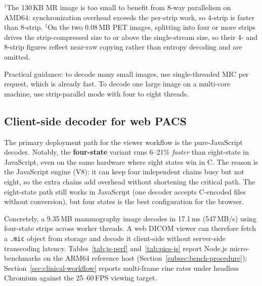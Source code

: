 \documentclass[journal]{IEEEtran}
\begin{document}
\begin{table}[htbp]
\vspace{2pt}
{\scriptsize $^\dagger$The 130\,KB MR image is too small to benefit from 8-way
parallelism on AMD64: synchronization overhead exceeds the per-strip work, so
4-strip is faster than 8-strip. $^\ddagger$On the two 0.08\,MB PET images,
splitting into four or more strips drives the strip-compressed size to or above
the single-stream size, so their 4- and 8-strip figures reflect near-raw
copying rather than entropy decoding and are omitted.}
\end{table}

Practical guidance: to decode many small images, use single-threaded MIC
per request, which is already fast. To decode one large image on a multi-core
machine, use strip-parallel mode with four to eight threads.

\subsection{Client-side decoder for web PACS}
\label{sec:browser-results}

The primary deployment path for the viewer workflow is the pure-JavaScript
decoder. Notably, the \textbf{four-state} variant runs 6--21\% \emph{faster}
than eight-state in JavaScript, even on the same hardware where eight states win
in C. The reason is the JavaScript engine (V8): it can keep four independent
chains busy but not eight, so the extra chains add overhead without shortening
the critical path. The eight-state path still works in JavaScript (one decoder
accepts C-encoded files without conversion), but four states is the best
configuration for the browser.

Concretely, a 9.35\,MB mammography image decodes in 17.1\,ms (547\,MB/s) using
four-state strips across worker threads. A web DICOM viewer can therefore fetch
a \texttt{.mic} object from storage and decode it client-side without
server-side transcoding latency. Tables~\ref{tab:js-perf}
and~\ref{tab:pics-js} report Node.js micro-benchmarks on the ARM64 reference
host (Section~\ref{subsec:bench-procedure}); Section~\ref{sec:clinical-workflow}
reports multi-frame cine rates under headless Chromium against the 25--60\,FPS
viewing target.
\end{document}
